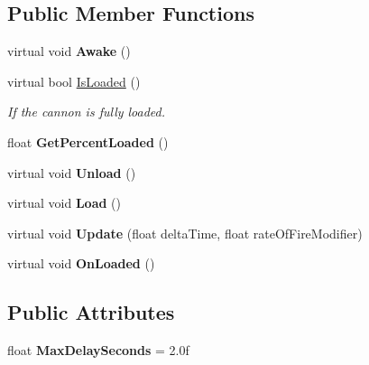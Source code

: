 \subsection*{Public Member Functions}
\begin{DoxyCompactItemize}
\item 
\hypertarget{class_skyrates_1_1_misc_1_1_state_cooldown_a9a1256aa97548caa86c6b9cd5fa863fa}{virtual void {\bfseries Awake} ()}\label{class_skyrates_1_1_misc_1_1_state_cooldown_a9a1256aa97548caa86c6b9cd5fa863fa}

\item 
virtual bool \hyperlink{class_skyrates_1_1_misc_1_1_state_cooldown_a13aa170fcf5b5b2c93d8b67cfba18a87}{Is\-Loaded} ()
\begin{DoxyCompactList}\small\item\em If the cannon is fully loaded. \end{DoxyCompactList}\item 
\hypertarget{class_skyrates_1_1_misc_1_1_state_cooldown_a48f7192d4204d8558d8489774065bd64}{float {\bfseries Get\-Percent\-Loaded} ()}\label{class_skyrates_1_1_misc_1_1_state_cooldown_a48f7192d4204d8558d8489774065bd64}

\item 
\hypertarget{class_skyrates_1_1_misc_1_1_state_cooldown_a5832056d37860ad0156828d13a3e10d4}{virtual void {\bfseries Unload} ()}\label{class_skyrates_1_1_misc_1_1_state_cooldown_a5832056d37860ad0156828d13a3e10d4}

\item 
\hypertarget{class_skyrates_1_1_misc_1_1_state_cooldown_af20da6c1e9325f7e815324b0453705b2}{virtual void {\bfseries Load} ()}\label{class_skyrates_1_1_misc_1_1_state_cooldown_af20da6c1e9325f7e815324b0453705b2}

\item 
\hypertarget{class_skyrates_1_1_misc_1_1_state_cooldown_aa00d823564e7ff2dd32da9068a93b1dc}{virtual void {\bfseries Update} (float delta\-Time, float rate\-Of\-Fire\-Modifier)}\label{class_skyrates_1_1_misc_1_1_state_cooldown_aa00d823564e7ff2dd32da9068a93b1dc}

\item 
\hypertarget{class_skyrates_1_1_misc_1_1_state_cooldown_ab87f7a11a7b52ce82e4589724f564dde}{virtual void {\bfseries On\-Loaded} ()}\label{class_skyrates_1_1_misc_1_1_state_cooldown_ab87f7a11a7b52ce82e4589724f564dde}

\end{DoxyCompactItemize}
\subsection*{Public Attributes}
\begin{DoxyCompactItemize}
\item 
\hypertarget{class_skyrates_1_1_misc_1_1_state_cooldown_a601fab3a0ba8b29cff2ea5f2e5f29de0}{float {\bfseries Max\-Delay\-Seconds} = 2.\-0f}\label{class_skyrates_1_1_misc_1_1_state_cooldown_a601fab3a0ba8b29cff2ea5f2e5f29de0}

\end{DoxyCompactItemize}
